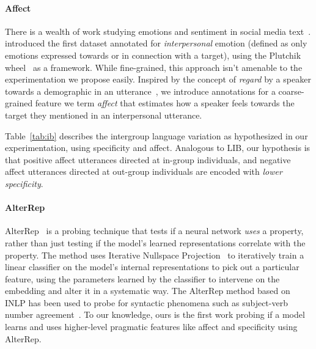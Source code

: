 

\paragraph{Affect} There is a wealth of work studying emotions and sentiment in social media text~\citep{mohammad-2012-emotional,6406313, Mohammad2015UsingHT, abdul-mageed-ungar-2017-emonet,desai-etal-2020-detecting,demszky-etal-2020-goemotions}. \citet{govindarajan-etal-2023-people} introduced the first dataset annotated for \emph{interpersonal} emotion (defined as only emotions expressed towards or in connection with a target), using the Plutchik wheel~\citep{plutchik1980general, plutchik2001nature} as a framework. While fine-grained, this approach isn't amenable to the experimentation we propose easily. Inspired by the concept of \emph{regard} by a speaker towards a demographic in an utterance~\citep{sheng-etal-2019-woman}, we introduce annotations for a coarse-grained feature we term \emph{affect} that estimates how a speaker feels towards the target they mentioned in an interpersonal utterance.

Table~\ref{tab:ib} describes the intergroup language variation as hypothesized in our experimentation, using specificity and affect. Analogous to LIB, our hypothesis is that positive affect utterances directed at in-group individuals, and negative affect utterances directed at out-group individuals are encoded with \emph{lower specificity}.

\paragraph{AlterRep} AlterRep~\citep{ravfogel-etal-2021-counterfactual} is a probing technique that tests if a neural network \emph{uses} a property, rather than just testing if the model's learned representations correlate with the property. The method uses Iterative Nullspace Projection~\citep[INLP;][]{ravfogel-etal-2020-null} to iteratively train a linear classifier on the model's internal representations to pick out a particular feature, using the parameters learned by the classifier to intervene on the embedding and alter it in a systematic way. The AlterRep method based on INLP has been used to probe for syntactic phenomena such as subject-verb number agreement~\citep{ravfogel-etal-2021-counterfactual}. To our knowledge, ours is the first work probing if a model learns and uses higher-level pragmatic features like affect and specificity using AlterRep.

